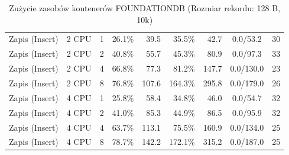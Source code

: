 \begin{table}[ht]
{\begin{tabular}{llcrrrrcc}
Zapis (Insert) & 2 CPU & 1 & 26.1\% & 39.5 & 35.5\% & 42.7 & 0.0/53.2 & 30 \\
Zapis (Insert) & 2 CPU & 2 & 40.8\% & 55.7 & 45.3\% & 80.9 & 0.0/97.3 & 33 \\
Zapis (Insert) & 2 CPU & 4 & 66.8\% & 77.3 & 81.2\% & 147.7 & 0.0/130.0 & 23 \\
Zapis (Insert) & 2 CPU & 8 & 76.8\% & 107.6 & 164.3\% & 295.8 & 0.0/179.0 & 26 \\
Zapis (Insert) & 4 CPU & 1 & 25.8\% & 58.4 & 34.8\% & 46.0 & 0.0/54.7 & 32 \\
Zapis (Insert) & 4 CPU & 2 & 41.0\% & 85.3 & 44.9\% & 86.5 & 0.0/95.9 & 32 \\
Zapis (Insert) & 4 CPU & 4 & 63.7\% & 113.1 & 75.5\% & 160.9 & 0.0/134.0 & 25 \\
Zapis (Insert) & 4 CPU & 8 & 78.7\% & 142.2 & 172.1\% & 315.2 & 0.0/187.0 & 25 \\
\bottomrule
\end{tabular}%
}
\caption{Zużycie zasobów kontenerów FOUNDATIONDB (Rozmiar rekordu: 128 B, 10k)}
\label{tab:resources_foundationdb_small_10000}
\end{table}
